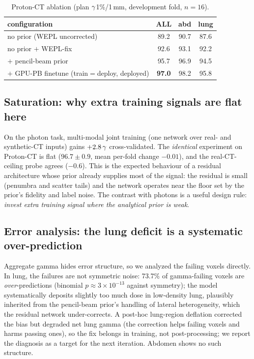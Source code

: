 \documentclass{llncs}
\begin{document}
\begin{table}[h]\centering
\caption{Proton-CT ablation (plan $\gamma$1\%/1\,mm, development fold, $n=16$).}\label{tab:abl}
\begin{tabular}{@{}lccc@{}}\toprule
configuration & ALL & abd & lung\\\midrule
no prior (WEPL uncorrected) & 89.2 & 90.7 & 87.6\\
no prior $+$ WEPL-fix & 92.6 & 93.1 & 92.2\\
$+$ pencil-beam prior & 95.7 & 96.9 & 94.5\\
$+$ GPU-PB finetune (train$=$deploy, deployed) & \textbf{97.0} & 98.2 & 95.8\\\bottomrule
\end{tabular}\end{table}

\subsection{Saturation: why extra training signals are flat here}
On the photon task, multi-modal joint training (one network over real- and synthetic-CT inputs)
gains $+2.8\,\gamma$ cross-validated. The \emph{identical} experiment on Proton-CT is flat
($96.7\pm0.9$, mean per-fold change $-0.01$), and the real-CT-ceiling probe agrees ($-0.6$).
This is the expected behaviour of a residual architecture whose prior already supplies most of
the signal: the residual is small (penumbra and scatter tails) and the network operates near the
floor set by the prior's fidelity and label noise. The contrast with photons is a useful design
rule: \emph{invest extra training signal where the analytical prior is weak}.

\subsection{Error analysis: the lung deficit is a systematic over-prediction}
Aggregate gamma hides error structure, so we analyzed the failing voxels directly. In lung, the
failures are not symmetric noise: 73.7\% of gamma-failing voxels are \emph{over}-predictions
(binomial $p\approx3\times10^{-13}$ against symmetry); the model systematically deposits
slightly too much dose in low-density lung, plausibly inherited from the pencil-beam prior's
handling of lateral heterogeneity, which the residual network under-corrects. A post-hoc
lung-region deflation corrected the bias but degraded net lung gamma (the correction helps
failing voxels and harms passing ones), so the fix belongs in training, not post-processing; we
report the diagnosis as a target for the next iteration. Abdomen shows no such structure.
\end{document}
